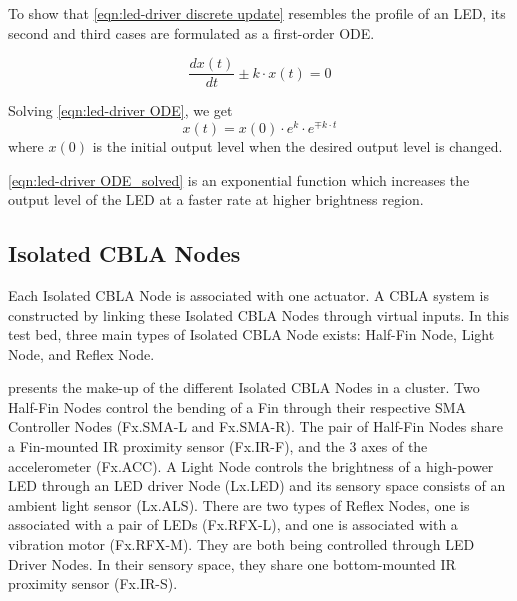 To show that \eqref{eqn:led-driver discrete update} resembles the profile of an LED, its second and third cases are formulated as a first-order ODE. 

\begin{equation}\label{eqn:led-driver ODE}
	 \frac{dx(t)}{dt} \pm k \cdot x(t)  = 0
\end{equation}

Solving \eqref{eqn:led-driver ODE}, we get 
\begin{equation}\label{eqn:led-driver ODE_solved}
	x(t) = x(0) \cdot e^k \cdot e^{\mp k \cdot t}
\end{equation}
where $x(0)$ is the initial output level when the desired output level is changed.

\eqref{eqn:led-driver ODE_solved} is an exponential function which increases the output level of the LED at a faster rate at higher brightness region. 

\subsection{Isolated CBLA Nodes}\label{sec:isolated-cbla-node}

Each Isolated CBLA Node is associated with one actuator. A CBLA system is constructed by linking these Isolated CBLA Nodes through virtual inputs. In this test bed, three main types of Isolated CBLA Node exists: Half-Fin Node, Light Node, and Reflex Node.
 
 presents the make-up of the different Isolated CBLA Nodes in a cluster. Two Half-Fin Nodes control the bending of a Fin through their respective SMA Controller Nodes (Fx.SMA-L and Fx.SMA-R). The pair of Half-Fin Nodes share a Fin-mounted IR proximity sensor (Fx.IR-F), and the 3 axes of the accelerometer (Fx.ACC). A Light Node controls the brightness of a high-power LED through an LED driver Node (Lx.LED) and its sensory space consists of an ambient light sensor (Lx.ALS). There are two types of Reflex Nodes, one is associated with a pair of LEDs (Fx.RFX-L), and one is associated with a vibration motor (Fx.RFX-M). They are both being controlled through LED Driver Nodes. In their sensory space, they share one bottom-mounted IR proximity sensor (Fx.IR-S). 

